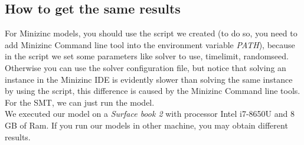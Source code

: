 \subsection{How to get the same results}
For Minizinc models, you should use the script we created (to do so, you need to add Minizinc Command line tool into the environment variable \emph{PATH}), because in the script we set some parameters like solver to use, time\-limit, random\-seed. Otherwise you can use the solver configuration file, but notice that solving an instance in the Minizinc IDE is evidently slower than solving the same instance by using the script, this difference is caused by the Minizinc Command line tools.\\
For the SMT, we can just run the model. \\
We executed our model on a \emph{Surface book 2} with processor Intel i7-8650U and 8 GB of Ram. If you run our models in other machine, you may obtain different results. 

\clearpage